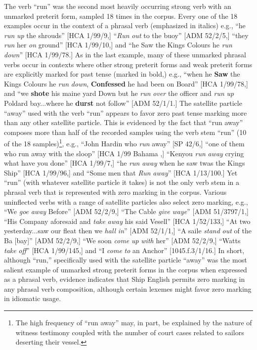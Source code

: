 The verb “run” was the second most heavily occurring strong verb with an unmarked preterit form, sampled 18 times in the corpus. Every one of the 18 examples occur in the context of a phrasal verb (emphasized in italics) e.g., “he \textit{run} \textit{up} the shrouds” [HCA 1/99/9,] “\textit{Run} \textit{out} to the buoy” [ADM 52/2/5,] “they \textit{run} her \textit{on} ground” [HCA 1/99/10,] and “he Saw the Kings Colours he \textit{run} \textit{down}” [HCA 1/99/78.] As in the last example, many of these unmarked phrasal verbs occur in contexts where other strong preterit forms and weak preterit forms are explicitly marked for past tense (marked in bold,) e.g., “when he \textbf{Saw} the Kings Colours he \textit{run} \textit{down}, \textbf{Confessed} he had been on Board” [HCA 1/99/78,] and “we \textbf{shote} his maine yard Down but he \textit{run} \textit{over} the officer and \textit{run} \textit{up} Poldard bay...where he \textbf{durst} not follow” [ADM 52/1/1.] The satellite particle “away” used with the verb “run” appears to favor zero past tense marking more than any other satellite particle. This is evidenced by the fact that “run away” composes more than half of the recorded samples using the verb stem “run” (10 of the 18 samples)\footnote{The high frequency of “run away” may, in part, be explained by the nature of witness testimony coupled with the number of court cases related to sailors deserting their vessel.}, e.g., “John Hardin who \textit{run} away” [SP 42/6,] “one of them who run away with the sloop” [HCA 1/99 Bahama \citealt{Islands1722},] “Kenyou \textit{run} \textit{away} crying what have you done” [HCA 1/99/7,] “he \textit{run} \textit{away} when he saw twas the Kings Ship” [HCA 1/99/96,] and “Some men that \textit{Run} \textit{away}” [HCA 1/13/100.] Yet “run” (with whatever satellite particle it takes) is not the only verb stem in a phrasal verb that is represented with zero marking in the corpus. Various uninflected verbs with a range of satellite particles also select zero marking, e.g., “We \textit{goe} \textit{away} Before” [ADM 52/2/9,] “The Cable \textit{give} \textit{waye}” [ADM 51/3797/1,] “His Company aforesaid and \textit{take} \textit{away} his said Vesell” [HCA 1/52/133,] “At two yesterday...saw our fleat then we \textit{hall} \textit{in}” [ADM 52/1/1,] “A saile \textit{stand} \textit{out} of the Ba [bay]” [ADM 52/2/9,] “We soon \textit{come} \textit{up} \textit{with} her” [ADM 52/2/9,] “Watts \textit{take} \textit{off}” [HCA 1/99/145,] and “I \textit{come} \textit{to} an Anchor” [1045.f.3/1/16.] In short, although “run,” specifically used with the satellite particle “away” was the most salient example of unmarked strong preterit forms in the corpus when expressed as a phrasal verb, evidence indicates that Ship English permits zero marking in any phrasal verb composition, although certain lexemes might favor zero marking in idiomatic usage. 

